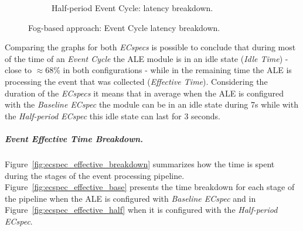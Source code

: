 \begin{figure}[ht!]
\begin{subfigure}{.5\textwidth}
          \caption{Half-period Event Cycle: latency breakdown.}
          \label{fig:ecspec_half}
        \end{subfigure}
        \caption[Fog-based approach: event latency breakdown.]{Fog-based approach: Event Cycle latency breakdown.}
        \label{fig:ecspec_breakdown}
      \end{figure}

      Comparing the graphs for both \textit{ECspecs} is possible to conclude that during most of the time of
      an \textit{Event Cycle} the \gls{ALE} module is in an idle state (\textit{Idle Time}) - close to $\approx68\%$
      in both configurations - while in the remaining time the \gls{ALE} is processing the event that was
      collected (\textit{Effective Time}). Considering the duration of the \textit{ECspecs} it means that in
      average when the \gls{ALE} is configured with the \textit{Baseline ECspec} the module can be in an idle
      state during 7s while with the \textit{Half-period ECspec} this idle state can last for 3 seconds.

      \subparagraph{Event Effective Time Breakdown.}
      \label{subp:fog_event_effective_breakdown}
      Figure~\ref{fig:ecspec_effective_breakdown} summarizes how the time is spent during the stages of the
      event processing pipeline. Figure~\ref{fig:ecspec_effective_base} presents the time breakdown for
      each stage of the pipeline when the \gls{ALE} is configured with \textit{Baseline ECspec} and in
      Figure~\ref{fig:ecspec_effective_half} when it is configured with the \textit{Half-period ECspec}.\\

